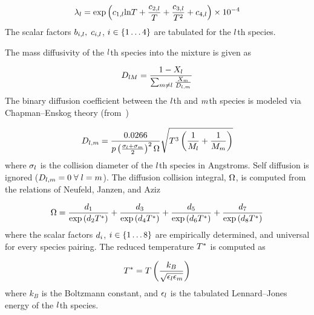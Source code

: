 \begin{equation}
	\lambda_{l} = \text{exp} \left(c_{1,l} \text{ln} T + \frac{c_{2,l}}{T} + \frac{c_{3,l}}{T^2} + c_{4,l} \right) \times 10^{-4}
\end{equation}
The scalar factors $b_{i,l}, \; c_{i,l}$, $i \in \{1 \hdots 4\}$ are tabulated for the $l$th species.

The mass diffusivity of the $l$th species into the mixture is given as 

\begin{equation}
	D_{l M} = \frac{1 - X_{l}}{\sum_{m \neq l} \frac{X_{m}}{D_{l, m}}}
\end{equation}
The binary diffusion coefficient between the $l$th and $m$th species is modeled via Chapman--Enskog theory (from~\cite{propGasLiquid})

\begin{equation}
	D_{l, m} = \frac{0.0266}{p \left(\frac{\sigma_{l} + \sigma_{m}}{2}\right)^2 \Omega} \sqrt{T^3 \left(\frac{1}{M_{l}} + \frac{1}{M_{m}}\right)}
\end{equation}
where $\sigma_{l}$ is the collision diameter of the $l$th species in Angstroms. Self diffusion is ignored ($D_{l, m} = 0 \; \forall \; l = m$). The diffusion collision integral, $\Omega$, is computed from the relations of Neufeld, Janzen, and Aziz~\cite{Neufeld1972}

\begin{equation}
	\Omega = \frac{d_{1}}{\text{exp} \left(d_{2} T^*\right)} + \frac{d_{3}}{\text{exp} \left(d_{4} T^*\right)} + \frac{d_{5}}{\text{exp} \left(d_{6} T^*\right)} + \frac{d_{7}}{\text{exp} \left(d_{8} T^*\right)}
\end{equation}
where the scalar factors $d_{i}$, $i \in \{1 \hdots 8\}$ are empirically determined, and universal for every species pairing. The reduced temperature $T^*$ is computed as

\begin{equation}
	T^* = T \left( \frac{k_B}{\sqrt{\epsilon_{l} \epsilon_{m}}} \right)
\end{equation}
where $k_B$ is the Boltzmann constant, and $\epsilon_{l}$ is the tabulated Lennard--Jones energy of the $l$th species.

